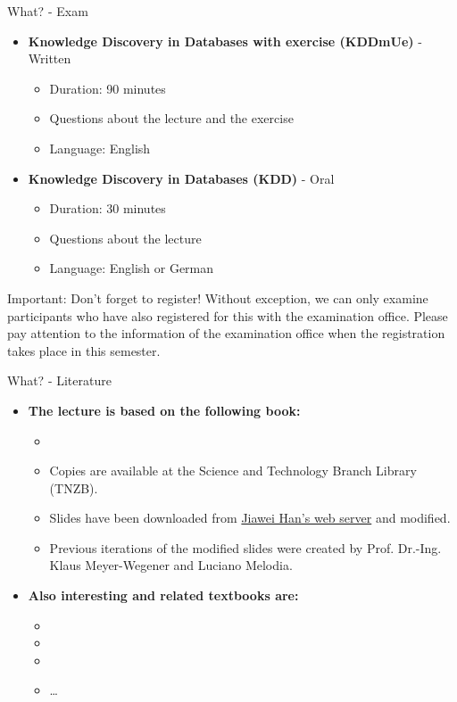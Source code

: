\begin{frame}{What? - Exam}
	\begin{itemize}
		\item \textbf{Knowledge Discovery in Databases with exercise (KDDmUe)} - Written
		      \begin{itemize}
			      \item Duration: 90 minutes
			      \item Questions about the lecture and the exercise
			      \item {\color{gray} Language: English}
		      \end{itemize}
		\item \textbf{Knowledge Discovery in Databases (KDD)} - Oral
		      \begin{itemize}
			      \item Duration: 30 minutes
			      \item Questions about the lecture
			      \item {\color{gray} Language: English or German}
		      \end{itemize}
	\end{itemize}
	\begin{alertblock}{Important: Don't forget to register!}
		Without exception, we can only examine participants who have also registered for this with the examination office. Please pay attention to the information of the examination office when the registration takes place in this semester.
	\end{alertblock}
\end{frame}

\begin{frame}{What? - Literature}
	\begin{itemize}
		\item \textbf{The lecture is based on the following book:}
		      \begin{itemize}
			      \item {}
			      \item Copies are available at the Science and Technology Branch Library (TNZB).
			      \item Slides have been downloaded from \href{http://hanj.cs.illinois.edu/}{Jiawei Han's web server} and modified.
			      \item Previous iterations of the modified slides were created by Prof. Dr.-Ing. Klaus Meyer-Wegener and Luciano Melodia.
		      \end{itemize}
		\item \textbf{Also interesting and related textbooks are:}
		      \begin{itemize}
			      \item {}
			      \item {}
			      \item {}
			      \item \ldots
		      \end{itemize}
	\end{itemize}
\end{frame}

